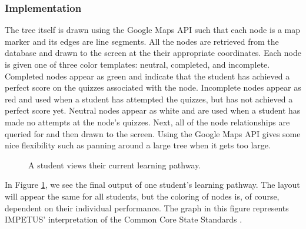 \subsubsection{Implementation}
The tree itself is drawn using the Google Maps API such that each node is a map marker and its edges are line segments. All the nodes are retrieved from the database and drawn to the screen at the their appropriate coordinates. Each node is given one of three color templates: neutral, completed, and incomplete. Completed nodes appear as green and indicate that the student has achieved a perfect score on the quizzes associated with the node. Incomplete nodes appear as red and used when a student has attempted the quizzes, but has not achieved a perfect score yet. Neutral nodes appear as white and are used when a student has made no attempts at the node's quizzes. Next, all of the node relationships are queried for and then drawn to the screen. Using the Google Maps API gives some nice flexibility such as panning around a large tree when it gets too large. 

\begin{figure}[h!]
	\centering
	\caption{A student views their current learning pathway.}
	\label{fig:screens-pathway-graph}
\end{figure}

In Figure \ref{fig:screens-pathway-graph}, we see the final output of one student's learning pathway. The layout will appear the same for all students, but the coloring of nodes is, of course, dependent on their individual performance. The graph in this figure represents IMPETUS' interpretation of the Common Core State Standards \cite{common-core-website}.

